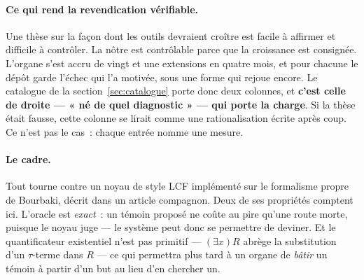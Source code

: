\documentclass[11pt]{article}
\theoremstyle{remark}\newtheorem{remarque}{Remarque}
\begin{document}
\paragraph{Ce qui rend la revendication vérifiable.} Une thèse sur la façon dont les
outils devraient croître est facile à affirmer et difficile à contrôler. La nôtre est
contrôlable parce que la croissance est consignée. L'organe s'est accru de vingt et une
extensions en quatre mois, et pour chacune le dépôt garde l'échec qui l'a motivée, sous
une forme qui rejoue encore. Le catalogue de la section~\ref{sec:catalogue} porte donc
deux colonnes, et \textbf{c'est celle de droite --- « né de quel diagnostic » --- qui
porte la charge}. Si la thèse était fausse, cette colonne se lirait comme une
rationalisation écrite après coup. Ce n'est pas le cas~: chaque entrée nomme une mesure.

\paragraph{Le cadre.} Tout tourne contre un noyau de style LCF implémenté sur le
formalisme propre de Bourbaki, décrit dans un article compagnon. Deux de ses propriétés
comptent ici. L'oracle est \emph{exact}~: un témoin proposé ne coûte au pire qu'une route
morte, puisque le noyau juge --- le système peut donc se permettre de deviner. Et le
quantificateur existentiel n'est pas primitif --- $(\exists x)R$ abrège la substitution
d'un $\tau$-terme dans $R$ --- ce qui permettra plus tard à un organe de \emph{bâtir} un
témoin à partir d'un but au lieu d'en chercher un.
\end{document}
